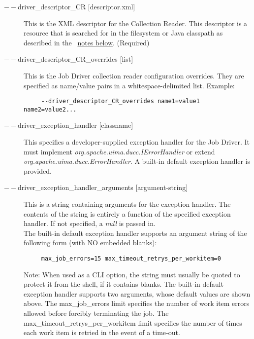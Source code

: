 \begin{description}
           \item[$--$driver\_descriptor\_CR {[descriptor.xml]} ] This is the XML descriptor for the
             Collection Reader.  This 
             descriptor is a resource that is searched for in the filesystem or Java classpath as described 
             in the ~\hyperref[par:cli.submit.notes]{notes below}. (Required)

           \item[$--$driver\_descriptor\_CR\_overrides {[list]} ]             
             This is the Job Driver collection reader configuration overrides. They are specified as 
             name/value pairs in a whitespace-delimited list. Example: 
             \begin{verbatim}
     --driver_descriptor_CR_overrides name1=value1 name2=value2...
             \end{verbatim}
             
           \item[$--$driver\_exception\_handler {[classname]}] 
             This specifies a developer-supplied exception handler for the Job Driver.  
             It must implement {\em org.apache.uima.ducc.IErrorHandler} or extend
             {\em org.apache.uima.ducc.ErrorHandler}.  A built-in default exception handler is provided.
           
           \item[$--$driver\_exception\_handler\_arguments {[argument-string]}] This is a string
             containing arguments for the exception handler.  The contents of
             the string is entirely a function of the specified exception handler.  If not specified,
             a {\em null} is passed in.
             \\The built-in default exception handler supports an argument string of the following form
             (with NO embedded blanks):
             \begin{verbatim}
     max_job_errors=15 max_timeout_retrys_per_workitem=0
             \end{verbatim}
             Note: When used as a CLI option, the string must usually be
             quoted to protect it from the shell, if it contains blanks.
             The built-in default exception handler supports two arguments, whose
             default values are shown above.  The max\_job\_errors limit specifies the number
             of work item errors allowed before forcibly terminating the job.  The
             max\_timeout\_retrys\_per\_workitem limit specifies the number of times each
             work item is retried in the event of a time-out.


\end{description}
